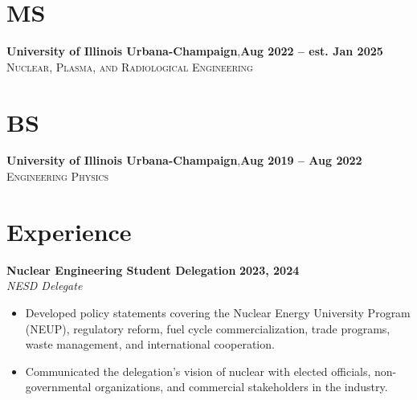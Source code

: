 \documentclass[margin,line]{resume}
\begin{document}
\begin{resume}
    \section{\mysidestyle MS}
    \textbf{University of Illinois Urbana-Champaign},\hfill\textbf{Aug 2022 -- est. Jan 2025}\\
    \textsc{Nuclear, Plasma, and Radiological Engineering}\\
    \vspace{-5.5mm}
    \section{\mysidestyle BS}
    \textbf{University of Illinois Urbana-Champaign},\hfill\textbf{Aug 2019 -- Aug 2022}\\%
    \textsc{Engineering Physics}\\
    \vspace{-5mm}

    \section{\mysidestyle Experience}
    \textbf{Nuclear Engineering Student Delegation} \hfill \textbf{2023, 2024} \\
    \textsl{NESD Delegate} \\
    \begin{itemize}
        \item Developed policy statements covering the Nuclear Energy University Program (NEUP), regulatory reform, fuel cycle commercialization, trade programs, waste management, and international cooperation.
        \item Communicated the delegation's vision of nuclear with elected officials, non-governmental organizations, and commercial stakeholders in the industry.
    \end{itemize}


\end{resume}
\end{document}
